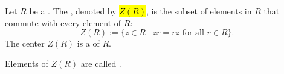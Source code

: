 \begin{definition} \label{definition:center_of_a_ring}
    Let $R$ be a . The , denoted by \hl{$Z(R)$}, is the subset of elements in $R$ that commute with every element of $R$:
    $$Z(R) := \{ z \in R \mid zr = rz \text{ for all } r \in R \}.$$
    The center $Z(R)$ is a   of $R$.

    Elements of $Z(R)$ are called .
\end{definition}